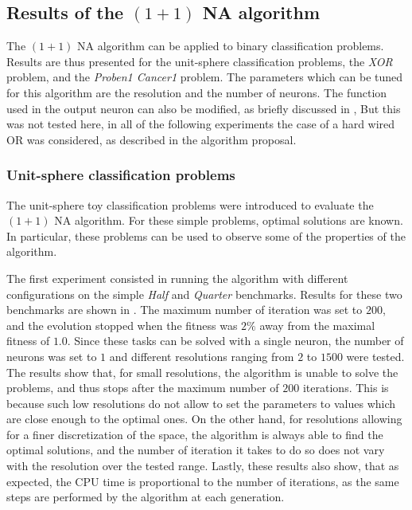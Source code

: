 \subsection{Results of the $(1 + 1)$ NA algorithm}

The $(1 + 1)$ NA algorithm can be applied to binary classification problems. Results are thus presented for the unit-sphere classification problems, the \textit{XOR} problem, and
the \textit{Proben1 Cancer1} problem.
The parameters which can be tuned for this algorithm are the resolution and the number of neurons. The function used in the output neuron can also be modified, as briefly discussed in \cite{na},
But this was not tested here, in all of the following experiments the case of a hard wired OR was considered, as described in the algorithm proposal.

\subsubsection{Unit-sphere classification problems}

The unit-sphere toy classification problems \cite{na} were introduced to evaluate the $(1 + 1)$ NA algorithm. For these simple problems, optimal solutions are known. In particular, these
problems can be used to observe some of the properties of the algorithm.

The first experiment consisted in running the algorithm with different configurations on the simple \textit{Half} and \textit{Quarter} benchmarks.
Results for these two benchmarks are shown in . The maximum number of iteration was set to $200$, and the evolution stopped when the fitness
was $2\%$ away from the maximal fitness of $1.0$. Since these tasks can be solved with a single neuron, the number of neurons was set to $1$ and different resolutions ranging
from $2$ to $1500$ were tested. The results show that, for small resolutions, the algorithm is unable to solve the problems, and thus stops after the maximum number of $200$ iterations. This is
because such low resolutions do not allow to set the parameters to values which are close enough to the optimal ones. On the other hand,
for resolutions allowing for a finer discretization of the space, the algorithm is always able to find the optimal solutions, and the number of iteration it takes to do so
does not vary with the resolution over the tested range. Lastly, these results also show, that as expected, the CPU time is proportional to the number of iterations,
as the same steps are performed by the algorithm at each generation.

